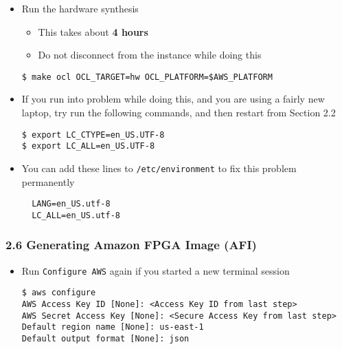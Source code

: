 \documentclass[]{article}
\begin{document}
\begin{itemize}
\item
  Run the hardware synthesis

  \begin{itemize}
  \item
    This takes about \textbf{4 hours}
  \item
    Do not disconnect from the instance while doing this
  \end{itemize}

\begin{verbatim}
$ make ocl OCL_TARGET=hw OCL_PLATFORM=$AWS_PLATFORM
\end{verbatim}
\end{itemize}

\begin{itemize}
\item
  If you run into problem while doing this, and you are using a fairly
  new laptop, try run the following commands, and then restart from
  Section 2.2

\begin{verbatim}
$ export LC_CTYPE=en_US.UTF-8
$ export LC_ALL=en_US.UTF-8
\end{verbatim}
\item
  You can add these lines to \texttt{/etc/environment} to fix this
  problem permanently

\begin{verbatim}
  LANG=en_US.utf-8
  LC_ALL=en_US.utf-8
\end{verbatim}
\end{itemize}

\hypertarget{header-n338}{%
\subsubsection{2.6 Generating Amazon FPGA Image
(AFI)}\label{header-n338}}

\begin{itemize}
\item
  Run \texttt{Configure\ AWS} again if you started a new terminal
  session

\begin{verbatim}
$ aws configure
AWS Access Key ID [None]: <Access Key ID from last step>
AWS Secret Access Key [None]: <Secure Access Key from last step>
Default region name [None]: us-east-1
Default output format [None]: json
\end{verbatim}
\end{itemize}
\end{document}
